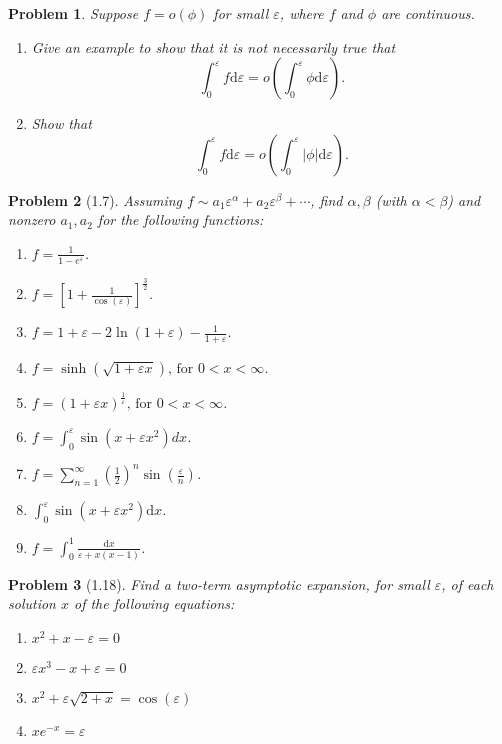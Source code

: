 \documentclass[11pt]{article}
\newcommand{\vep}{\varepsilon}
\theoremstyle{problemstyle}
\newtheorem{problem}{Problem}
\begin{document}
\begin{problem}{1.5}
Suppose $f=o(\phi)$ for small $\vep$, where $f$ and $\phi$ are continuous.
\begin{enumerate}
  \item Give an example to show that it is not necessarily true that
    \[ \int_0^\vep f \mathrm{d} \vep = o\left(\int_0^\vep \phi \mathrm{d}
    \vep \right).\]
  \item Show that 
    \[ \int_0^\vep f \mathrm{d} \vep = o\left(\int_0^\vep \vert \phi \vert
    \mathrm{d} \vep \right).\]
\end{enumerate}
\end{problem}

\begin{problem}[1.7]
Assuming $f \sim a_1 \vep^\alpha + a_2 \vep^\beta + \cdots$, find $\alpha, \beta$
(with $\alpha < \beta$) and nonzero $a_1, a_2$ for the following functions:
\begin{enumerate}
  \item $\displaystyle f = \frac{1}{1 - e^{\vep}}$.
  \item $\displaystyle f = \left[1 + \frac{1}{\cos(\vep)}\right]^{\frac{3}{2}}$.
  \item $\displaystyle f = 1 + \vep - 2\ln\left(1 + \vep\right) - \frac{1}{1 + \vep}$.
  \item $\displaystyle f = \sinh\left(\sqrt{1 + \vep x}\right) \text{, for } 0 < x < \infty$.
  \item $\displaystyle f = \left(1 + \vep x\right)^{\frac{1}{\vep}} \text{, for } 0 < x < \infty$.
  \item $\displaystyle f = \int_{0}^{\vep} \sin\left(x + \vep x^{2}\right)dx$.
  \item $\displaystyle f = \displaystyle \sum_{n=1}^{\infty} \left(\frac{1}{2}\right)^n 
              \sin\left(\frac{\vep}{n}\right)$.
  \item $\displaystyle \int_0^\vep \sin(x + \vep x^2) \mathrm{d}x$.
  \item $\displaystyle f = \int_0^1 \frac{\mathrm{d}x}{\vep + x(x-1)}$.
\end{enumerate}
\end{problem}

\begin{problem}[1.18]
  Find a two-term asymptotic expansion, for small $\vep$, of each solution $x$ of the
  following equations:
  \begin{enumerate}
    \item $x^2 + x - \vep = 0$
    \item[(e)] $\vep x^3 -x + \vep = 0$
    \item[(h)] $x^2 + \vep \sqrt{2+x} = \cos(\vep)$
    \item[(p)] $xe^{-x} = \vep$
  \end{enumerate}
\end{problem}
\end{document}
